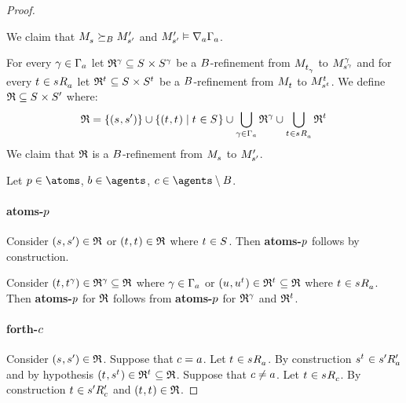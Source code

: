 \begin{proof}
\begin{figure}
\end{figure}

We claim that $\kPModel{\kStateS} \simulatesBs \kPModelP{\kStateSP}$ and $\kPModelP{\kStateSP} \entails \coversA \Gamma_\agentA$.

For every $\gamma \in \Gamma_\agentA$ let $\refinement^\gamma \subseteq \kStates \times \kStates[\gamma]$ be a $\agentsB$-refinement from $\kPModel{\kStateT_\gamma}$ to $\kPModel[\gamma]{\kStateS[\gamma]}$ and
for every $\kStateT \in \kSuccessorsA{\kStateS}$ let $\refinement^{\kStateT} \subseteq \kStates \times \kStates[\kStateT]$ be a $\agentsB$-refinement from $\kPModel{\kStateT}$ to $\kPModel[\kStateT]{\kStateS[\kStateT]}$.
We define $\refinement \subseteq \kStates \times \kStatesP$ where:
$$
\refinement = \{(\kStateS, \kStateSP)\} \cup \{(\kStateT, \kStateT) \mid \kStateT \in \kStates\} \cup \bigcup_{\gamma \in \Gamma_\agentA} \refinement^\gamma \cup \bigcup_{\kStateT \in \kSuccessorsA{\kStateS}} \refinement^{\kStateT}
$$
We claim that $\refinement$ is a $\agentsB$-refinement from $\kPModel{\kStateS}$ to $\kPModelP{\kStateSP}$.

Let $\atomP \in \atoms$, $\agentB \in \agents$, $\agentC \in \agents \setminus \agentsB$.

\paragraph{atoms-$\atomP$}
Consider $(\kStateS, \kStateSP) \in \refinement$ or $(\kStateT, \kStateT) \in \refinement$ where $\kStateT \in \kStates$.
Then {\bf atoms-$\atomP$} follows by construction.

Consider $(\kStateT, \kStateT[\gamma]) \in \refinement^\gamma \subseteq \refinement$ where $\gamma \in \Gamma_\agentA$ or $(\kStateU, \kStateU[\kStateT]) \in \refinement^{\kStateT} \subseteq \refinement$ where $\kStateT \in \kSuccessorsA{\kStateS}$.
Then {\bf atoms-$\atomP$} for $\refinement$ follows from {\bf atoms-$\atomP$} for $\refinement^\gamma$ and $\refinement^{\kStateT}$.

\paragraph{forth-$\agentC$}
Consider $(\kStateS, \kStateSP) \in \refinement$.
Suppose that $\agentC = \agentA$.
Let $\kStateT \in \kSuccessorsA{\kStateS}$.
By construction $\kStateS[\kStateT] \in \kSuccessorsPA{\kStateSP}$ and by hypothesis $(\kStateT, \kStateS[\kStateT]) \in \refinement^{\kStateT} \subseteq \refinement$.
Suppose that $\agentC \neq \agentA$.
Let $\kStateT \in \kSuccessorsC{\kStateS}$.
By construction $\kStateT \in \kSuccessorsPC{\kStateSP}$ and $(\kStateT, \kStateT) \in \refinement$.


\end{proof}
